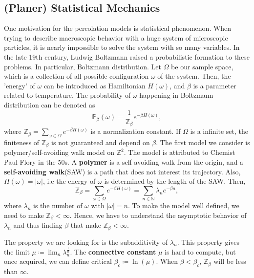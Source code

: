 \documentclass[12pt]{article}
\theoremstyle{plane}
\theoremstyle{definition}
\begin{document}
\subsection{(Planer) Statistical Mechanics}
One motivation for the percolation models is statistical phenomenon. When trying to describe macroscopic behavior with a huge system of microscopic particles, it is nearly impossible to solve the system with so many variables.
In the late 19th century, Ludwig Boltzmann raised a probabilistic formation to these problems. In particular, Boltzmann distribution. 
Let $\Omega$ be our sample space, which is a collection of all possible configuration $\omega$ of the system. Then, the 'energy' of $\omega$ can be introduced as Hamiltonian $H(\omega)$, and $\beta$ is a parameter related to temperature.
The probability of $\omega$ happening in Boltzmann distribution can be denoted as 
$$
    \mathbb{P}_\beta(\omega) = \frac{1}{\mathbb{Z_\beta}}e^{-\beta H(\omega)}, 
$$ 
where $\mathbb{Z}_\beta = \sum_{\omega \in \Omega} e^{-\beta H(\omega)}$ is a normalization constant.
If $\Omega$ is a infinite set, the finiteness of $\mathbb{Z}_\beta$ is not guaranteed and depend on $\beta$.
The first model we consider is polymer/self-avoiding walk model on $\mathbb{Z}^2$. The model is attributed to Chemist Paul Flory in the 50s. A \textbf{polymer} is a self avoiding walk from the origin, and a \textbf{self-avoiding walk}(SAW) is a path that does not interest its trajectory.
Also, $H(\omega)= |\omega|$, i.e the energy of $\omega$ is determined by the length of the SAW. 
Then, 
$$
    \mathbb{Z_\beta} = \sum_{\omega \in \Omega} e^{-\beta H(\omega)} = \sum_{n \in \mathbb{N}} \lambda_n e^{-\beta n}, 
$$
where $\lambda_n$ is the number of $\omega$ with $|\omega| = n$.
To make the model well defined, we need to make $\mathbb{Z}_\beta < \infty$. Hence, we have to understand the asymptotic behavior of $\lambda_n$ and thus finding $\beta$ that make $\mathbb{Z}_\beta < \infty$.

The property we are looking for is the subadditivity of $\lambda_n$. This property gives the limit $\mu \coloneqq \lim_n \lambda_n^{\frac{1}{n}}$. The \textbf{connective constant} $\mu$ is hard to compute, but once acquired, we can define critical $\beta_c \coloneqq \ln{(\mu)}$.
When $\beta < \beta_c$, $\mathbb{Z}_\beta$ will be less than $\infty$.

\end{document}
